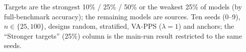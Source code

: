 Targets are the strongest 10\% / 25\% / 50\% or the weakest 25\% of models (by full-benchmark accuracy); the remaining models are sources. Ten seeds (0--9), $n\in\{25,100\}$, designs random, stratified, VA-PPS ($\lambda=1$) and anchors; the ``Stronger targets'' (25\%) column is the main-run result restricted to the same seeds.
\begin{table}[h]
\caption{Relative RMSE vs.\ random sampling under different shift severities (geometric mean over 13 benchmarks; 95\% hierarchical-bootstrap intervals).}\label{tab:shift}
\centering\tiny\setlength{\tabcolsep}{1.5pt}\resizebox{\linewidth}{!}{}
\end{table}
\begin{table}[h]
\caption{Mean signed error (accuracy points, averaged over benchmarks) and bias$^2$/MSE at $n=100$ under different shifts.}\label{tab:shiftbias}
\centering\tiny\setlength{\tabcolsep}{1.5pt}\resizebox{\linewidth}{!}{}
\end{table}
